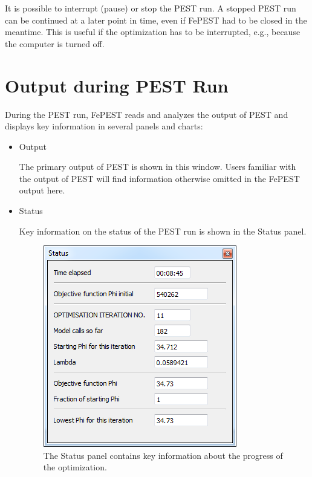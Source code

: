 It is possible to interrupt (pause) or stop the PEST run. A stopped PEST run can be continued at a later point in time, even if FePEST had to be closed in the meantime. This is useful if the optimization has to be interrupted, e.g., because the computer is turned off. 

\section{Output during PEST Run}

During the PEST run, FePEST reads and analyzes the output of PEST and displays key information in several panels and charts:

\begin{itemize}
\item Output

The primary output of PEST is shown in this window. Users familiar with the output of PEST will find information otherwise omitted in the FePEST output here.

\item Status

Key information on the status of the PEST run is shown in the Status panel.

\begin{figure}
	\center
	\includegraphics[width=\columnwidth]{figures/statusPanel.png}
\caption{The Status panel contains key information about the progress of the optimization.}
\label{fig:fepest:statusPanel}
\end{figure}


\end{itemize}
